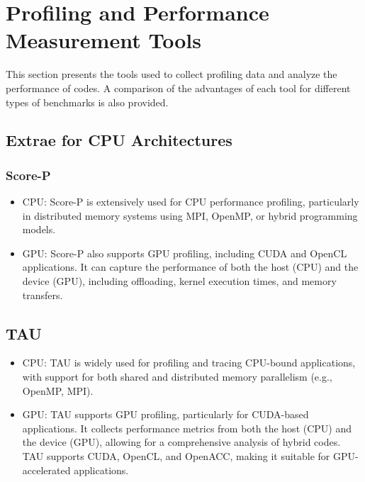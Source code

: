 \section{Profiling and Performance Measurement Tools}
\label{sec:methodology-tools}

This section presents the tools used to collect profiling data and analyze the performance of codes. 
A comparison of the advantages of each tool for different types of benchmarks is also provided.

\subsection{Extrae for CPU Architectures}
\label{sec:methodology-tools-extrae}

\subsubsection{Score-P}
\label{sec:methodology-tools-scorep}

\begin{itemize}
    \item CPU: Score-P is extensively used for CPU performance profiling, particularly in distributed memory systems using MPI, OpenMP, or hybrid programming models.
    \item GPU: Score-P also supports GPU profiling, including CUDA and OpenCL applications. It can capture the performance of both the host (CPU) and the device (GPU), including offloading, kernel execution times, and memory transfers.
\end{itemize}


\subsection{TAU}
\label{sec:methodology-tools-tau}

\begin{itemize}
    \item CPU: TAU is widely used for profiling and tracing CPU-bound applications, with support for both shared and distributed memory parallelism (e.g., OpenMP, MPI).
    \item GPU: TAU supports GPU profiling, particularly for CUDA-based applications. It collects performance metrics from both the host (CPU) and the device (GPU), allowing for a comprehensive analysis of hybrid codes. TAU supports CUDA, OpenCL, and OpenACC, making it suitable for GPU-accelerated applications.
\end{itemize}


